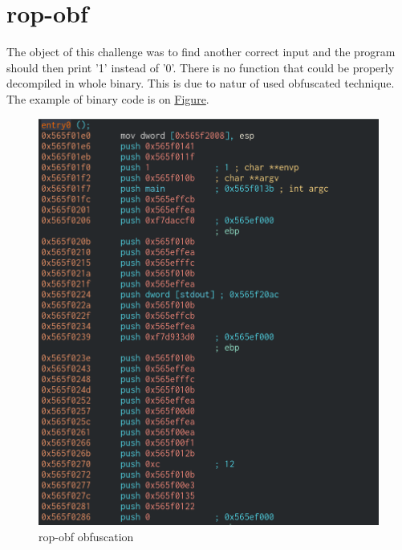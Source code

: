 \documentclass[11pt]{article}
\begin{document}
\section{rop-obf}
\label{sec:orgefbd3d7}
The object of this challenge was to find another correct input and the program should then print '1' instead of
'0'. There is no function that could be properly decompiled in whole binary. This is due to natur of used obfuscated technique. The example of binary code is on \hyperref[fig-rop-entry]{Figure}.
\begin{figure}[htbp]
\centering
\includegraphics[width=.9\linewidth]{rop_obf.png}
\caption{\label{fig-rop-entry}rop-obf obfuscation}
\end{figure}
\end{document}
